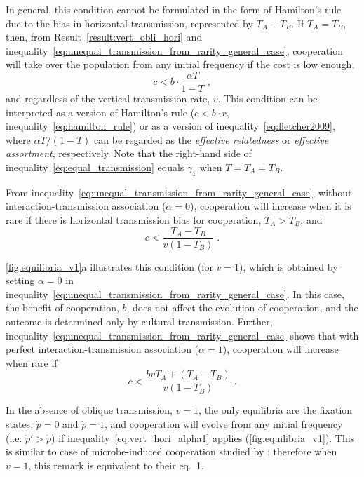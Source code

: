 \documentclass[12pt]{extarticle}
\begin{document}
In general, this condition cannot be formulated in the form of Hamilton's rule due to the bias in horizontal transmission, represented by $T_A-T_B$.
If $T_A=T_B$, then, from Result~\ref{result:vert_obli_hori} and inequality~\ref{eq:unequal_transmission_from_rarity_general_case}, cooperation will take over the population from any initial frequency if the cost is low enough,
\begin{equation}
\label{eq:equal_transmission}
c < b \cdot \frac{\alpha T}{1-T} \;,
\end{equation}
and regardless of the vertical transmission rate, $v$.
This condition can be interpreted as a version of Hamilton's rule  ($c<b\cdot r$, inequality~\ref{eq:hamilton_rule}) or as a version of inequality~\ref{eq:fletcher2009}, where $\alpha T/(1-T)$ can be regarded as the \emph{effective relatedness} or \emph{effective assortment}, respectively.
Note that the right-hand side of inequality~\ref{eq:equal_transmission} equals $\gamma_1$ when $T=T_A=T_B$.

From inequality~\ref{eq:unequal_transmission_from_rarity_general_case}, without interaction-transmission association ($\alpha=0$), cooperation will increase when it is rare if there is horizontal transmission bias for cooperation, $T_A>T_B$, and
\begin{equation}
\label{eq:vert_hori_alpha0}
c < \frac{T_A - T_B}{v(1-T_B)} \;.
\end{equation}

\autoref{fig:equilibria_v1}a illustrates this condition (for $v=1$), which is obtained by setting $\alpha=0$ in inequality~\ref{eq:unequal_transmission_from_rarity_general_case}.
In this case, the benefit of cooperation, $b$, does not affect the evolution of cooperation, and the outcome is determined only by  cultural transmission.
Further, inequality~\ref{eq:unequal_transmission_from_rarity_general_case} shows that with perfect interaction-transmission association ($\alpha=1$), cooperation will increase when rare if
\begin{equation}\label{eq:vert_hori_alpha1}
c < \frac{b v T_A + (T_A - T_B)}{v(1-T_B)} \;.
\end{equation}

In the absence of oblique transmission, $v=1$, the only equilibria are the fixation states, $\dot{p}=0$ and $\dot{p}=1$, and cooperation will evolve from any initial frequency (i.e. $\dot{p}'>\dot{p}$) if inequality~\ref{eq:vert_hori_alpha1} applies (\autoref{fig:equilibria_v1}).
This is similar to case of microbe-induced cooperation studied by \citet{lewin2017microbes}; therefore when $v=1$, this remark is equivalent to their eq.~1.
\end{document}
